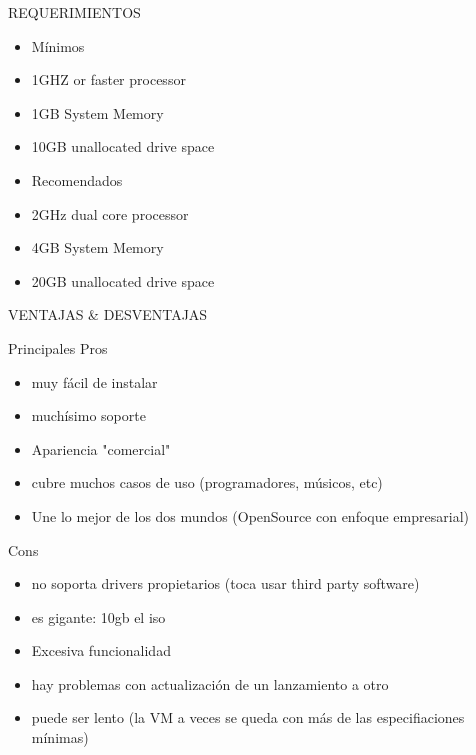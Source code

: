 \documentclass[presentation]{beamer}
\begin{document}
\begin{frame}[label=sec-19]{REQUERIMIENTOS}
\begin{itemize}
\item Mínimos

\item 1GHZ  or faster processor
\item 1GB System Memory
\item 10GB unallocated drive space
\end{itemize}


\begin{itemize}
\item Recomendados

\item 2GHz dual core processor
\item 4GB System Memory
\item 20GB unallocated drive space
\end{itemize}
\end{frame}



\begin{frame}[label=sec-20]{VENTAJAS \& DESVENTAJAS}
\begin{block}{Principales}
Pros
\begin{itemize}
\item muy fácil de instalar
\item muchísimo soporte
\item Apariencia "comercial"
\item cubre muchos casos de uso (programadores, músicos, etc)
\item Une lo mejor de los dos mundos (OpenSource con enfoque empresarial)
\end{itemize}


Cons
\begin{itemize}
\item no soporta drivers propietarios (toca usar third party software)
\item es gigante: 10gb el iso
\item Excesiva funcionalidad
\item hay problemas con actualización de un lanzamiento a otro
\item puede ser lento (la VM a veces se queda con más de las especifiaciones mínimas)
\end{itemize}
\end{block}
\end{frame}
\end{document}
